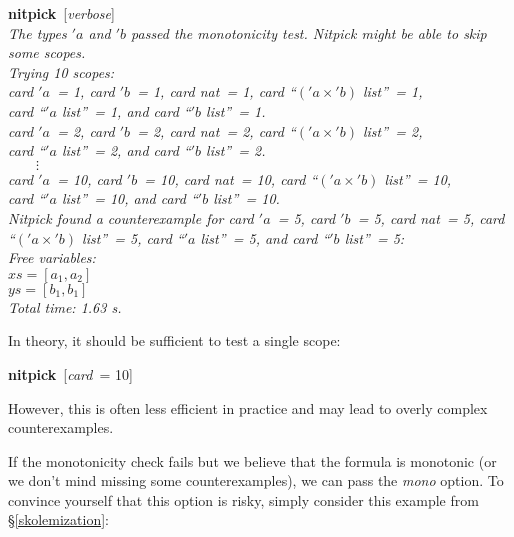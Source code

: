 \documentclass[a4paper,12pt]{article}
\renewcommand\_{\hbox{\textunderscore\kern-.05ex}}
\begin{document}
\prew
\textbf{nitpick}~[\textit{verbose}] \\[2\smallskipamount]
\slshape
The types $'a$ and $'b$ passed the monotonicity test.
Nitpick might be able to skip some scopes.
 \\[2\smallskipamount]
Trying 10 scopes: \\
\hbox{}\qquad \textit{card} $'a$~= 1, \textit{card} $'b$~= 1,
\textit{card} \textit{nat}~= 1, \textit{card} ``$('a \times {'}b)$
\textit{list\/}''~= 1, \\
\hbox{}\qquad\quad \textit{card} ``\kern1pt$'a$ \textit{list\/}''~= 1, and
\textit{card} ``\kern1pt$'b$ \textit{list\/}''~= 1. \\
\hbox{}\qquad \textit{card} $'a$~= 2, \textit{card} $'b$~= 2,
\textit{card} \textit{nat}~= 2, \textit{card} ``$('a \times {'}b)$
\textit{list\/}''~= 2, \\
\hbox{}\qquad\quad \textit{card} ``\kern1pt$'a$ \textit{list\/}''~= 2, and
\textit{card} ``\kern1pt$'b$ \textit{list\/}''~= 2. \\
\hbox{}\qquad $\qquad\vdots$ \\[.5\smallskipamount]
\hbox{}\qquad \textit{card} $'a$~= 10, \textit{card} $'b$~= 10,
\textit{card} \textit{nat}~= 10, \textit{card} ``$('a \times {'}b)$
\textit{list\/}''~= 10, \\
\hbox{}\qquad\quad \textit{card} ``\kern1pt$'a$ \textit{list\/}''~= 10, and
\textit{card} ``\kern1pt$'b$ \textit{list\/}''~= 10.
\\[2\smallskipamount]
Nitpick found a counterexample for
\textit{card} $'a$~= 5, \textit{card} $'b$~= 5,
\textit{card} \textit{nat}~= 5, \textit{card} ``$('a \times {'}b)$
\textit{list\/}''~= 5, \textit{card} ``\kern1pt$'a$ \textit{list\/}''~= 5, and
\textit{card} ``\kern1pt$'b$ \textit{list\/}''~= 5:
\\[2\smallskipamount]
\hbox{}\qquad Free variables: \nopagebreak \\
\hbox{}\qquad\qquad $\textit{xs} = [a_1, a_2]$ \\
\hbox{}\qquad\qquad $\textit{ys} = [b_1, b_1]$ \\[2\smallskipamount]
Total time: 1.63 s.
\postw

In theory, it should be sufficient to test a single scope:

\prew
\textbf{nitpick}~[\textit{card}~= 10]
\postw

However, this is often less efficient in practice and may lead to overly complex
counterexamples.

If the monotonicity check fails but we believe that the formula is monotonic (or
we don't mind missing some counterexamples), we can pass the
\textit{mono} option. To convince yourself that this option is risky,
simply consider this example from \S\ref{skolemization}:
\end{document}
